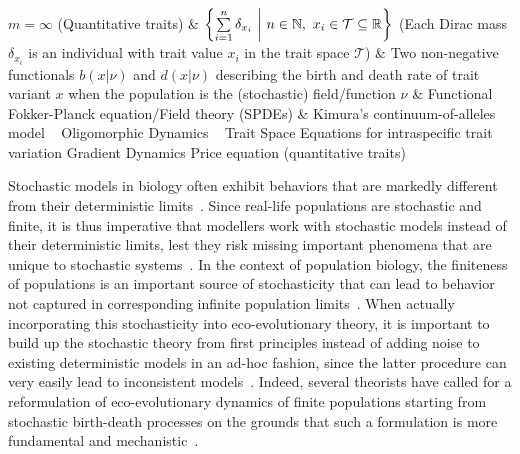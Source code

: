 {\begin{sideways}
\begin{minipage}{\textheight}
{\begin{tabular}
					$m = \infty$ \newline (Quantitative traits) & $ \left\{\sum\limits_{i=1}^{n}\delta_{x_i} \ \bigg{|} \ n \in \mathbb{N}, \ x_i \in \mathcal{T} \subseteq \mathbb{R}\right\}$ \newline \newline (Each Dirac mass $\delta_{x_i}$ is an individual with trait value $x_i$ in the trait space $\mathcal{T}$) & Two non-negative functionals $b(x|\nu)$ and $d(x|\nu)$ describing the birth and death rate of trait variant $x$ when the population is the (stochastic) field/function $\nu$ & Functional Fokker-Planck equation/Field theory \newline (SPDEs) & Kimura's continuum-of-alleles model \newline~ Oligomorphic Dynamics \newline~ Trait Space Equations for intraspecific trait variation \newline Gradient Dynamics \newline Price equation (quantitative traits)\\
					\hline
				\end{tabular}
			}
			\label{table_summary}
		\end{minipage}
	\end{sideways}\par}
\clearpage

Stochastic models in biology often exhibit behaviors that are markedly different from their deterministic limits~\citep{jafarpour_noise-induced_2017,boettiger_noise_2018,jhawar_noise-induced_2020,coomer_noise_2022}. Since real-life populations are stochastic and finite, it is thus imperative that modellers work with stochastic models instead of their deterministic limits, lest they risk missing important phenomena that are unique to stochastic systems~\citep{black_stochastic_2012,hastings_transients_2004,shoemaker_integrating_2020,schreiber_does_2022}. In the context of population biology, the finiteness of populations is an important source of stochasticity that can lead to behavior not captured in corresponding infinite population limits~\citep{black_stochastic_2012,rogers_demographic_2012,debarre_evolutionary_2016,delong_stochasticity_2023}. When actually incorporating this stochasticity into eco-evolutionary theory, it is important to build up the stochastic theory from first principles instead of adding noise to existing deterministic models in an ad-hoc fashion, since the latter procedure can very easily lead to inconsistent models~\citep{strang_how_2019}. Indeed, several theorists have called for a reformulation of eco-evolutionary dynamics of finite populations starting from stochastic birth-death processes on the grounds that such a formulation is more fundamental and mechanistic~\citep{metcalf_why_2007,geritz_mathematical_2012,doebeli_towards_2017}.

